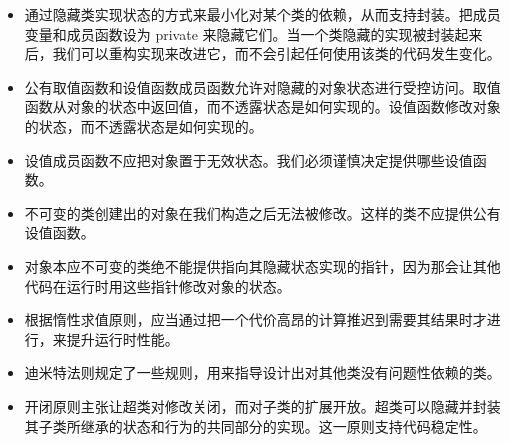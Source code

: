 \begin{itemize}
\item 通过隐藏类实现状态的方式来最小化对某个类的依赖，从而支持封装。把成员变量和成员函数设为 private 来隐藏它们。当一个类隐藏的实现被封装起来后，我们可以重构实现来改进它，而不会引起任何使用该类的代码发生变化。
\item 公有取值函数和设值函数成员函数允许对隐藏的对象状态进行受控访问。取值函数从对象的状态中返回值，而不透露状态是如何实现的。设值函数修改对象的状态，而不透露状态是如何实现的。
\item 设值成员函数不应把对象置于无效状态。我们必须谨慎决定提供哪些设值函数。
\item 不可变的类创建出的对象在我们构造之后无法被修改。这样的类不应提供公有设值函数。
\item 对象本应不可变的类绝不能提供指向其隐藏状态实现的指针，因为那会让其他代码在运行时用这些指针修改对象的状态。
\item 根据惰性求值原则，应当通过把一个代价高昂的计算推迟到需要其结果时才进行，来提升运行时性能。
\item 迪米特法则规定了一些规则，用来指导设计出对其他类没有问题性依赖的类。
\item 开闭原则主张让超类对修改关闭，而对子类的扩展开放。超类可以隐藏并封装其子类所继承的状态和行为的共同部分的实现。这一原则支持代码稳定性。
\end{itemize}
